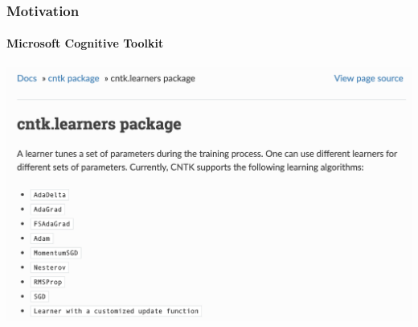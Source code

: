 \documentclass{beamer}
\begin{document}
\begin{frame}
    \frametitle{Motivation}
    \framesubtitle{Microsoft Cognitive Toolkit}
    
    \includegraphics[width=1\columnwidth]{cntk-algs.png}
    
\end{frame}
\end{document}
